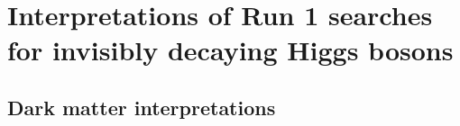 \chapter{Interpretations of Run 1 searches for invisibly decaying Higgs bosons}
\label{chap:interp}


\section{Dark matter interpretations}
\label{sec:dminterp}
